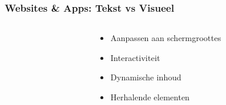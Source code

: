 \documentclass[../presentatie.tex]{subfiles}
\begin{document}
    \begin{frame}
        \frametitle{Websites \& Apps: Tekst vs Visueel}
        \begin{columns}
            \begin{column}{0.6\textwidth}
                \vspace{10px}
                \unless\ifishandout
                \fi
            \end{column}
            \begin{column}{0.45\textwidth}
                \begin{itemize}
                    \item Aanpassen aan schermgroottes
                    \item Interactiviteit
                    \item Dynamische inhoud
                    \item Herhalende elementen
                \end{itemize}
            \end{column}
        \end{columns}
    \end{frame}
\end{document}
